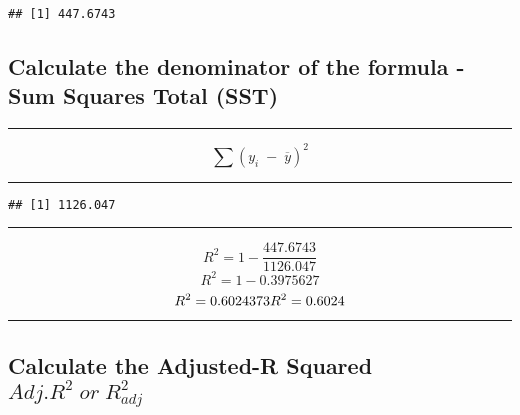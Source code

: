 \documentclass[
]{book}
\newenvironment{Shaded}{\begin{snugshade}}{\end{snugshade}}
\newcommand{\DecValTok}[1]{\textcolor[rgb]{0.00,0.00,0.81}{#1}}
\newcommand{\FunctionTok}[1]{\textcolor[rgb]{0.13,0.29,0.53}{\textbf{#1}}}
\newcommand{\NormalTok}[1]{#1}
\newcommand{\OtherTok}[1]{\textcolor[rgb]{0.56,0.35,0.01}{#1}}
\newcommand{\SpecialCharTok}[1]{\textcolor[rgb]{0.81,0.36,0.00}{\textbf{#1}}}
\theoremstyle{definition}
\theoremstyle{definition}
\theoremstyle{definition}
\theoremstyle{definition}
\theoremstyle{remark}
\begin{document}
\begin{verbatim}
## [1] 447.6743
\end{verbatim}

\hypertarget{calculate-the-denominator-of-the-formula---sum-squares-total-sst}{%
\subsection{Calculate the denominator of the formula - Sum Squares Total (SST)}\label{calculate-the-denominator-of-the-formula---sum-squares-total-sst}}

\begin{center}\rule{0.5\linewidth}{0.5pt}\end{center}

\[
\sum(y_{i}\;-\;\overline{y})^2
\]

\begin{center}\rule{0.5\linewidth}{0.5pt}\end{center}

\begin{Shaded}
\end{Shaded}

\begin{verbatim}
## [1] 1126.047
\end{verbatim}

\begin{center}\rule{0.5\linewidth}{0.5pt}\end{center}

\[
R^2 = 1- \frac{447.6743}{1126.047}
\]
\[
R^2 = 1- 0.3975627
\]
\[
R^2 = 0.6024373
\\
R^2 = 0.6024
\]

\begin{center}\rule{0.5\linewidth}{0.5pt}\end{center}

\hypertarget{calculate-the-adjusted-r-squared-adj.r2orr2_adj}{%
\subsection{\texorpdfstring{Calculate the Adjusted-R Squared \(Adj.R^2\;or\;R^2_{adj}\)}{Calculate the Adjusted-R Squared Adj.R\^{}2\textbackslash;or\textbackslash;R\^{}2\_\{adj\}}}\label{calculate-the-adjusted-r-squared-adj.r2orr2_adj}}
\end{document}
